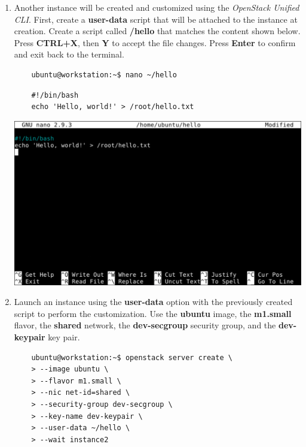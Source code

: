 \documentclass[letterpaper, 12pt]{article}
\begin{document}
\begin{enumerate}
    \item Another instance will be created and customized using the \textit{OpenStack Unified CLI}. First, create a
    \textbf{user-data} script that will be attached to the instance at creation. Create a script called
    \textbf{\texttildemid/hello} that matches the content shown below. Press \textbf{CTRL+X}, then \textbf{Y} to
    accept the file changes. Press \textbf{Enter} to confirm and exit back to the terminal.
    \begin{lstlisting}
    ubuntu@workstation:~$ nano ~/hello
    \end{lstlisting}
    \begin{lstlisting}
    #!/bin/bash
    echo 'Hello, world!' > /root/hello.txt
    \end{lstlisting}

    \begin{center}
        \includegraphics[width=\linewidth]{images/part1/step34.png}
    \end{center}

    \item Launch an instance using the \textbf{user-data} option with the previously created script to perform the
    customization. Use the \textbf{ubuntu} image, the \textbf{m1.small} flavor, the \textbf{shared} network, the
    \textbf{dev-secgroup} security group, and the \textbf{dev-keypair} key pair.
    \begin{lstlisting}
    ubuntu@workstation:~$ openstack server create \
    > --image ubuntu \
    > --flavor m1.small \
    > --nic net-id=shared \
    > --security-group dev-secgroup \
    > --key-name dev-keypair \
    > --user-data ~/hello \
    > --wait instance2
    \end{lstlisting}


\end{enumerate}
\end{document}

